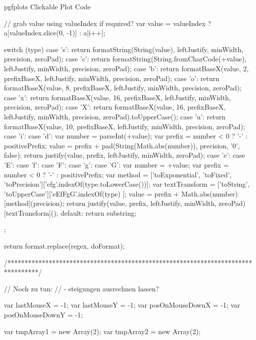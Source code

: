 {{\begin{insDLJS}[processAnnotatedPlot]{\jobname}{pgfplots Clickable Plot Code}
{{        // grab value using valueIndex if required?
        var value = valueIndex ? a[valueIndex.slice(0, -1)] : a[i++];

        switch (type) {
            case 's': return formatString(String(value), leftJustify, minWidth, precision, zeroPad);
            case 'c': return formatString(String.fromCharCode(+value), leftJustify, minWidth, precision, zeroPad);
            case 'b': return formatBaseX(value, 2, prefixBaseX, leftJustify, minWidth, precision, zeroPad);
            case 'o': return formatBaseX(value, 8, prefixBaseX, leftJustify, minWidth, precision, zeroPad);
            case 'x': return formatBaseX(value, 16, prefixBaseX, leftJustify, minWidth, precision, zeroPad);
            case 'X': return formatBaseX(value, 16, prefixBaseX, leftJustify, minWidth, precision, zeroPad).toUpperCase();
            case 'u': return formatBaseX(value, 10, prefixBaseX, leftJustify, minWidth, precision, zeroPad);
            case 'i':
            case 'd': {
                        var number = parseInt(+value);
                        var prefix = number < 0 ? '-' : positivePrefix;
                        value = prefix + pad(String(Math.abs(number)), precision, '0', false);
                        return justify(value, prefix, leftJustify, minWidth, zeroPad);
                    }
            case 'e':
            case 'E':
            case 'f':
            case 'F':
            case 'g':
            case 'G':
                        {
                        var number = +value;
                        var prefix = number < 0 ? '-' : positivePrefix;
                        var method = ['toExponential', 'toFixed', 'toPrecision']['efg'.indexOf(type.toLowerCase())];
                        var textTransform = ['toString', 'toUpperCase']['eEfFgG'.indexOf(type) ];
                        value = prefix + Math.abs(number)[method](precision);
                        return justify(value, prefix, leftJustify, minWidth, zeroPad)[textTransform]();
                    }
            default: return substring;
        }
    };

    return format.replace(regex, doFormat);
}
/*********************************************************************************/


// Noch zu tun:
// - steigungen ausrechnen lassen?

var lastMouseX = -1;
var lastMouseY = -1;
var posOnMouseDownX = -1;
var posOnMouseDownY = -1;

var tmpArray1 = new Array(2);
var tmpArray2 = new Array(2);


\end{insDLJS}}}

